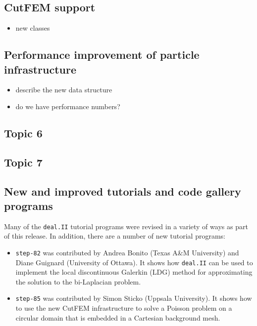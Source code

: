 \documentclass{ansarticle-preprint}
\newcommand{\specialword}[1]{\texttt{#1}}
\newcommand{\dealii}{{\specialword{deal.II}}\xspace}
\begin{document}
\subsection{CutFEM support}\label{sec:cut}

\begin{itemize}
\item new classes
\end{itemize}

\subsection{Performance improvement of particle infrastructure}\label{sec:particles}

\begin{itemize}
\item describe the new data structure
\item do we have performance numbers?
\end{itemize}



\subsection{Topic 6}



\subsection{Topic 7}



\subsection{New and improved tutorials and code gallery programs}
\label{subsec:steps}

Many of the \dealii{} tutorial programs were revised in a variety of
ways as part of this release. In addition, there are a number of new tutorial programs:
\begin{itemize}
\item \texttt{step-82} was contributed by Andrea Bonito (Texas A\&M University) and Diane Guignard (University of Ottawa). It shows how
\dealii{} can be used to implement the
local discontinuous Galerkin (LDG) method for approximating the solution to the bi-Laplacian problem.
\item \texttt{step-85} was contributed by Simon Sticko (Uppsala University). It shows how to use the new CutFEM infrastructure to solve a Poisson 
problem on a circular domain that is embedded in a Cartesian background mesh.
\end{itemize}
\end{document}
